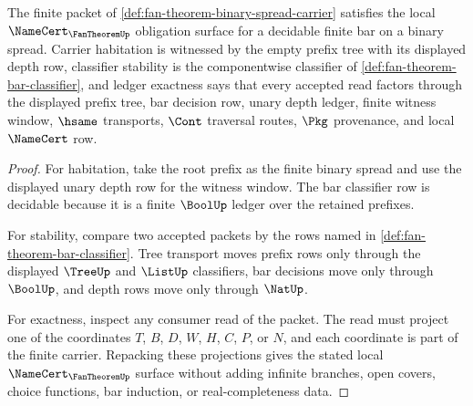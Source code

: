 \begin{theorem}
\label{thm:fan-theorem-namecert-obligations}
The finite packet of \autoref{def:fan-theorem-binary-spread-carrier} satisfies the local $\NameCert_{\FanTheoremUp}$ obligation surface for a decidable finite bar on a binary spread. Carrier habitation is witnessed by the empty prefix tree with its displayed depth row, classifier stability is the componentwise classifier of \autoref{def:fan-theorem-bar-classifier}, and ledger exactness says that every accepted read factors through the displayed prefix tree, bar decision row, unary depth ledger, finite witness window, $\hsame$ transports, $\Cont$ traversal routes, $\Pkg$ provenance, and local $\NameCert$ row.
\end{theorem}
\begin{proof}
For habitation, take the root prefix as the finite binary spread and use the displayed unary depth row for the witness window. The bar classifier row is decidable because it is a finite $\BoolUp$ ledger over the retained prefixes.

For stability, compare two accepted packets by the rows named in \autoref{def:fan-theorem-bar-classifier}. Tree transport moves prefix rows only through the displayed $\TreeUp$ and $\ListUp$ classifiers, bar decisions move only through $\BoolUp$, and depth rows move only through $\NatUp$.

For exactness, inspect any consumer read of the packet. The read must project one of the coordinates $T$, $B$, $D$, $W$, $H$, $C$, $P$, or $N$, and each coordinate is part of the finite carrier. Repacking these projections gives the stated local $\NameCert_{\FanTheoremUp}$ surface without adding infinite branches, open covers, choice functions, bar induction, or real-completeness data.
\end{proof}

